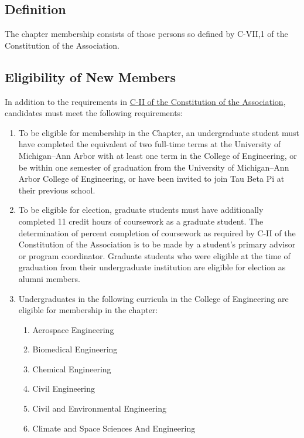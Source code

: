 \subsection{Definition} \label{IV.1}
The chapter membership consists of those persons so defined by C-VII,1 of the Constitution of the Association.

\subsection{Eligibility of New Members} \label{IV.2}
In addition to the requirements in \href{http://www.tbp.org/off/ConstBylaw.pdf}{C-II of the Constitution of the Association}, candidates must meet the following requirements:

\begin{enumerate}
    \item {}
    To be eligible for membership in the Chapter, an undergraduate student must have completed the equivalent of two full-time terms at the University of Michigan--Ann Arbor with at least one term in the College of Engineering, or be within one semester of graduation from the University of Michigan--Ann Arbor College of Engineering, or have been invited to join Tau Beta Pi at their previous school.
    \item {}
    To be eligible for election, graduate students must have additionally completed 11 credit hours of coursework as a graduate student.
The determination of percent completion of coursework as required by C-II of the Constitution of the Association is to be made by a student's primary advisor or program coordinator.
Graduate students who were eligible at the time of graduation from their undergraduate institution are eligible for election as alumni members.
    \item {}
    Undergraduates in the following curricula in the College of Engineering are eligible for membership in the chapter:
    \begin{enumerate}
        \item Aerospace Engineering
        \item Biomedical Engineering
        \item Chemical Engineering
        \item Civil Engineering
        \item Civil and Environmental Engineering
        \item Climate and Space Sciences And Engineering

\end{enumerate}
\end{enumerate}
